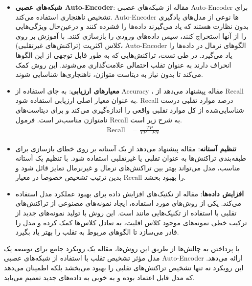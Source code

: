 \documentclass{article}
\begin{document}
\begin{itemize}
    \item \textbf{شبکه‌های عصبی Auto-Encoder}:
     مقاله از شبکه‌های عصبی
      Auto-Encoder 
      برای تشخیص ناهنجاری استفاده می‌کند.
       Auto-Encoder
       ها نوعی از مدل‌های یادگیری بدون نظارت هستند که یاد می‌گیرند داده‌ها را فشرده کنند و درعین‌حال ویژگی‌هایی را از آنها استخراج کنند، سپس داده‌های ورودی را بازسازی کنند. با آموزش بر روی کلاس اکثریت (تراکنش‌های غیرتقلبی)،
        Auto-Encoder 
        الگوهای نرمال در داده‌ها را یاد می‌گیرد. در طی تست، تراکنش‌هایی که به طور قابل توجهی از این الگوها انحراف دارند به عنوان تقلب احتمالی علامت‌گذاری می‌شوند. این روش کمک می‌کند تا بدون نیاز به دیتاست متوازن، ناهنجاری‌ها شناسایی شوند.
    
        \item \textbf{معیارهای ارزیابی}: 
        به جای استفاده از 
        Accuracy
        ، مقاله پیشنهاد می‌دهد از 
        Recall
         به عنوان معیار اصلی ارزیابی استفاده شود. 
         Recall
          درصد موارد تقلبی درست شناسایی‌شده از کل موارد تقلبی واقعی را اندازه‌گیری می‌کند و برای دیتاست‌های نامتوازن مناسب‌تر است. فرمول 
          Recall 
          به شرح زیر است.
          \begin{align}
          \label{frecall}
          \text{Recall}    &= \frac{TP}{TP+FN}
          \end{align}
    
    
    \item \textbf{تنظیم آستانه}:
     مقاله پیشنهاد می‌دهد از یک آستانه بر روی خطای بازسازی برای طبقه‌بندی تراکنش‌ها به عنوان تقلبی یا غیرتقلبی استفاده شود. با تنظیم یک آستانه مناسب، مدل می‌تواند بهتر بین تراکنش‌های نرمال و غیرنرمال تمایز قائل شود و بدین ترتیب تشخیص خصوصا در معیار
     Recall
      را بهبود بخشد.
    
    \item \textbf{افزایش داده‌ها}: 
مقاله از تکنیک‌های افزایش داده برای بهبود عملکرد مدل استفاده می‌کند. یکی از روش‌های مورد استفاده، ایجاد نمونه‌های مصنوعی از تراکنش‌های تقلبی با استفاده از تکنیک‌هایی مانند 
است. این روش با تولید نمونه‌های جدید از ترکیب خطی نمونه‌های موجود کلاس اقلیت، به تعادل کلاس‌ها کمک کرده و مدل را قادر می‌سازد تا الگوهای مربوط به تقلب را بهتر یاد بگیرد.

\end{itemize}

با پرداختن به چالش‌ها از طریق این روش‌ها، مقاله یک رویکرد جامع برای توسعه یک مدل مؤثر تشخیص تقلب با استفاده از شبکه‌های عصبی Auto-Encoder ارائه می‌دهد. این رویکرد نه تنها تشخیص تراکنش‌های تقلبی را بهبود می‌بخشد بلکه اطمینان می‌دهد که مدل قابل اعتماد بوده و به خوبی به داده‌های جدید تعمیم می‌یابد.
\end{document}
